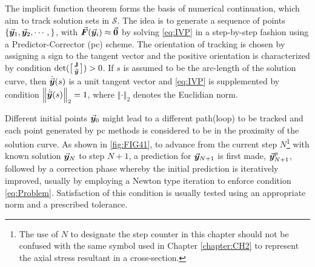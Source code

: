 The implicit function theorem forms the basis of numerical
continuation\cite{Allgower:2003,Rheinboldt75,Rheinboldt:2000,Rheinboldt:1980,
Garcia:1980,Watson86,Keller:1978}, which aim to track solution sets in 
$\mathcal{S}$. The idea is to generate a sequence of points
$\{\vec{\bm{y}}_1,\vec{\bm{y}}_2,\cdots,\}$, with 
$\vec{\bm{F}}(\vec{\bm{y}}_i)\approx\vec{\bm{0}}$  by solving
\ref{eq:IVP} in a step-by-step fashion using a Predictor-Corrector 
(\acrshort{pc}) scheme. The orientation of tracking is chosen by assigning a 
sign to the tangent vector and the positive orientation is
characterized by condition $\text{det}(\bigl[
\begin{smallmatrix}
	\mathbf{J} \\ \dot{\vec{\bm{y}}}
\end{smallmatrix}
\bigr]) > 0$. If $s$ is assumed to be the arc-length of the solution curve, then
$\dot{\vec{\bm{y}}}(s)$ is a unit tangent vector and \ref{eq:IVP} is supplemented by
condition $\left\Vert \dot{\vec{\bm{y}}}(s)\right\Vert_2=1$, where $\left\Vert
\cdot\right\Vert_2$ denotes the Euclidian norm.

Different initial points $\vec{\bm{y}}_0$ might
lead to a different path(loop) to be tracked and each point generated by 
\acrshort{pc} methods is considered to be in the proximity of the solution 
curve. As shown in \ref{fig:FIG41}, to advance from the
current step $N$\footnote{The use of $N$ to designate the step counter in this 
chapter should not be confused with the same symbol used in Chapter 
\ref{chapter:CH2} to represent the axial stress resultant in a cross-section.} 
with known solution $\vec{\bm{y}}_N$ to step $N+1$, a
prediction for $\vec{\bm{y}}_{N+1}$ is first made, $\vec{\bm{y}}_{N+1}^p$, followed by 
a 
correction phase 
whereby the initial prediction is iteratively improved, usually by employing a
Newton type iteration to enforce condition \ref{eq:Problem}. Satisfaction of
this condition is usually tested using an appropriate norm and a
prescribed tolerance. 

